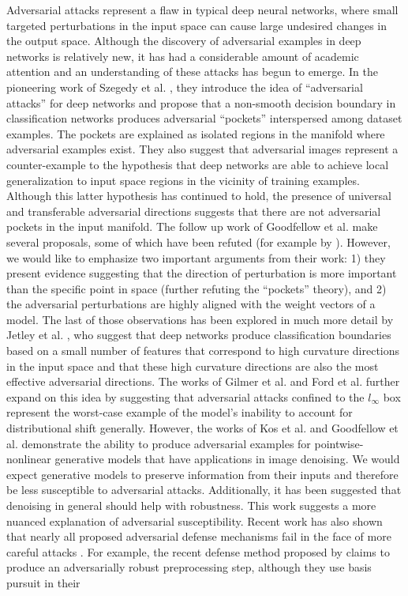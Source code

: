 Adversarial attacks represent a flaw in typical deep neural networks, where small targeted perturbations in the input space can cause large undesired changes in the output space. Although the discovery of adversarial examples in deep networks is relatively new, it has had a considerable amount of academic attention and an understanding of these attacks has begun to emerge. In the pioneering work of Szegedy et al. \citeyearpar{szegedy2013intriguing}, they introduce the idea of ``adversarial attacks'' for deep networks and propose that a non-smooth decision boundary in classification networks produces adversarial ``pockets'' interspersed among dataset examples. The pockets are explained as isolated regions in the manifold where adversarial examples exist. They also suggest that adversarial images represent a counter-example to the hypothesis that deep networks are able to achieve local generalization to input space regions in the vicinity of training examples. Although this latter hypothesis has continued to hold, the presence of universal and transferable adversarial directions \parencite{moosavi2017universal} suggests that there are not adversarial pockets in the input manifold. The follow up work of Goodfellow et al. \citeyearpar{goodfellow2014explaining} make several proposals, some of which have been refuted (for example by \cite{jetley2018friends}). However, we would like to emphasize two important arguments from their work: 1) they present evidence suggesting that the direction of perturbation is more important than the specific point in space (further refuting the ``pockets'' theory), and 2) the adversarial perturbations are highly aligned with the weight vectors of a model. The last of those observations has been explored in much more detail by Jetley et al. \citeyearpar{jetley2018friends}, who suggest that deep networks produce classification boundaries based on a small number of features that correspond to high curvature directions in the input space and that these high curvature directions are also the most effective adversarial directions. The works of Gilmer et al. \citeyearpar{gilmer2018adversarial} and Ford et al. \citeyearpar{ford2019adversarial} further expand on this idea by suggesting that adversarial attacks confined to the $l_{\infty}$ box represent the worst-case example of the model's inability to account for distributional shift generally. However, the works of Kos et al. \citeyearpar{kos2018adversarial} and Goodfellow et al. \citeyearpar{goodfellow2014explaining} demonstrate the ability to produce adversarial examples for pointwise-nonlinear generative models that have applications in image denoising. We would expect generative models to preserve information from their inputs and therefore be less susceptible to adversarial attacks. Additionally, it has been suggested that denoising in general should help with robustness. This work suggests a more nuanced explanation of adversarial susceptibility. Recent work has also shown that nearly all proposed adversarial defense mechanisms fail in the face of more careful attacks \parencite{carlini2017towards, athalye2018obfuscated}. For example, the recent defense method proposed by \cite{sun2018adversarial} claims to produce an adversarially robust preprocessing step, although they use basis pursuit in their 